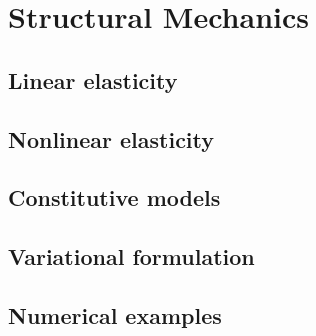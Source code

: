 \chapter{Structural Mechanics}
\label{ch:struct}

\section{Linear elasticity}
\label{sec:struct:linear}


\section{Nonlinear elasticity}
\label{sec:struct:nonlinear}


\section{Constitutive models}
\label{sec:struct:constitutive}


\section{Variational formulation}
\label{sec:struct:variational}


\section{Numerical examples}
\label{sec:struct:examples}
